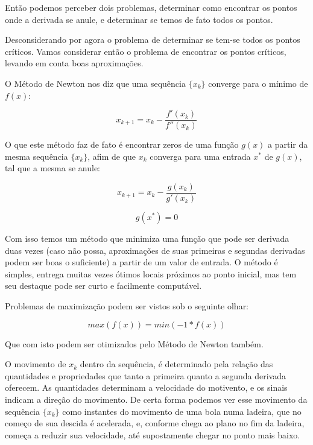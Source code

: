 Então podemos perceber dois problemas, determinar como encontrar os pontos onde
a derivada se anule, e determinar se temos de fato todos os pontos.

Desconsiderando por agora o problema de determinar se tem-se todos os pontos
críticos. Vamos considerar então o problema de encontrar os pontos críticos,
levando em conta boas aproximações.

O Método de Newton nos diz que uma sequência \(\{x_k\}\) converge para o mínimo
de \(f(x)\):

\begin{equation}
    x_{k+1} = x_{k} - \frac {f'(x_{k})}{f''(x_{k})}
\end{equation}

O que este método faz de fato é encontrar zeros de uma função \(g(x)\) a partir
da mesma sequência \(\{x_k\}\), afim de que \(x_k\) converga para uma entrada
\(x^*\) de \(g(x)\), tal que a mesma se anule:

\begin{equation}
    x_{k+1} = x_{k} - \frac {g(x_{k})}{g'(x_{k})}
\end{equation}

\begin{equation}
    g(x^*) = 0
\end{equation}


Com isso temos um método que minimiza uma função que pode ser derivada duas
vezes (caso não possa, aproximações de suas primeiras e segundas derivadas
podem ser boas o suficiente) a partir de um valor de entrada. O método é
simples, entrega muitas vezes ótimos locais próximos ao ponto inicial, mas tem
seu destaque pode ser curto e facilmente computável.

Problemas de maximização podem ser vistos sob o seguinte olhar:

\begin{equation}
    max(f(x)) = min(-1 * f(x))
\end{equation}

Que com isto podem ser otimizados pelo Método de Newton também.

O movimento de \(x_k\) dentro da sequência, é determinado pela relação das
quantidades e propriedades que tanto a primeira quanto a segunda derivada
oferecem. As quantidades determinam a velocidade do motivento, e os sinais
indicam a direção do movimento. De certa forma podemos ver esse movimento da
sequência \(\{x_k\}\) como instantes do movimento de uma bola numa ladeira, que
no começo de sua descida é acelerada, e, conforme chega ao plano no fim da
ladeira, começa a reduzir sua velocidade, até supostamente chegar no ponto mais
baixo.

